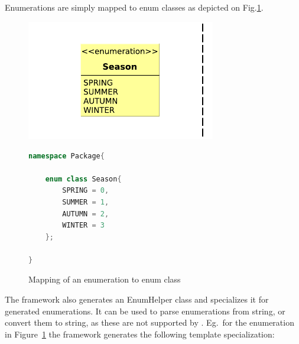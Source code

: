 Enumerations are simply mapped to \cpp{} enum classes as depicted on Fig.\ref{fig:eenum-to-cpp}.

\begin{figure}[H]
	\begin{center}
		
		\begin{minipage}[c]{\textwidth}
		\begin{minipage}[r]{0.52\textwidth}
			\hfill
			\includegraphics[width=0.735\textwidth]{figures/eenum-to-cpp.pdf}
		\end{minipage}
			\hspace{0.05\textwidth}
		\begin{minipage}[c]{0.25\textwidth}
\begin{lstlisting}[language=C++]
namespace Package{
	
	enum class Season{
		SPRING = 0,
		SUMMER = 1,
		AUTUMN = 2,
		WINTER = 3
	};

}
\end{lstlisting}			
		\end{minipage}
		\end{minipage}
		\caption{Mapping of an enumeration to \protect\cpp{} enum class }
		\label{fig:eenum-to-cpp}
	\end{center}
\end{figure}


The framework also generates an EnumHelper class and specializes it for generated enumerations. It can be used to  parse enumerations from string, or convert them to string, as these are not supported by \cpp{}. Eg.\ for the enumeration in Figure~\ref{fig:eenum-to-cpp} the framework generates the following template specialization:

